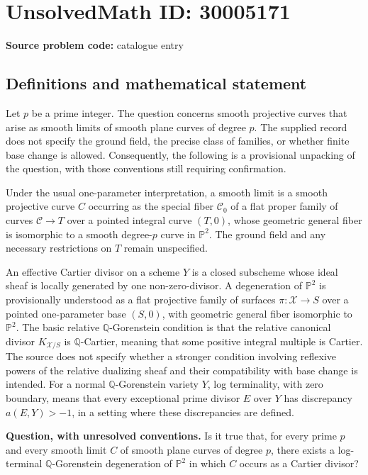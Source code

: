 \documentclass[11pt]{article}
\newcommand{\Q}{\mathbb{Q}}
\newcommand{\PP}{\mathbb{P}}
\begin{document}
\section*{UnsolvedMath ID: 30005171}
\textbf{Source problem code:} catalogue entry
\subsection{Definitions and mathematical statement}
Let \(p\) be a prime integer. The question concerns smooth projective curves that arise as smooth limits of smooth plane curves of degree \(p\). The supplied record does not specify the ground field, the precise class of families, or whether finite base change is allowed. Consequently, the following is a provisional unpacking of the question, with those conventions still requiring confirmation.

Under the usual one-parameter interpretation, a smooth limit is a smooth projective curve \(C\) occurring as the special fiber \(\mathcal C_0\) of a flat proper family of curves \(\mathcal C\to T\) over a pointed integral curve \((T,0)\), whose geometric general fiber is isomorphic to a smooth degree-\(p\) curve in \(\PP^2\). The ground field and any necessary restrictions on \(T\) remain unspecified.

An effective Cartier divisor on a scheme \(Y\) is a closed subscheme whose ideal sheaf is locally generated by one non-zero-divisor. A degeneration of \(\PP^2\) is provisionally understood as a flat projective family of surfaces \(\pi\colon\mathcal X\to S\) over a pointed one-parameter base \((S,0)\), with geometric general fiber isomorphic to \(\PP^2\). The basic relative \(\Q\)-Gorenstein condition is that the relative canonical divisor \(K_{\mathcal X/S}\) is \(\Q\)-Cartier, meaning that some positive integral multiple is Cartier. The source does not specify whether a stronger condition involving reflexive powers of the relative dualizing sheaf and their compatibility with base change is intended. For a normal \(\Q\)-Gorenstein variety \(Y\), log terminality, with zero boundary, means that every exceptional prime divisor \(E\) over \(Y\) has discrepancy \(a(E,Y)>-1\), in a setting where these discrepancies are defined.

\textbf{Question, with unresolved conventions.} Is it true that, for every prime \(p\) and every smooth limit \(C\) of smooth plane curves of degree \(p\), there exists a log-terminal \(\Q\)-Gorenstein degeneration of \(\PP^2\) in which \(C\) occurs as a Cartier divisor?
\end{document}
